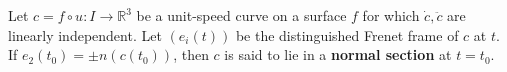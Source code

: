 Let $c = f \circ u: I \to \mathbb{R}^3$ be a unit-speed curve on a surface $f$ for which $\dot{c}, \ddot{c}$ are linearly independent. Let $(e_i(t))$ be the distinguished Frenet frame of $c$ at $t$. If $e_2(t_0) = \pm n(c(t_0))$, then $c$ is said to lie in a \textbf{normal section} at $t = t_0$.
